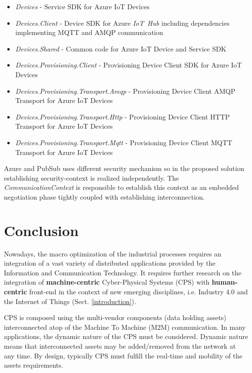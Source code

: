 \documentclass{jacsart}
\begin{document}
\begin{itemize}
      \item \textit{Devices} - Service SDK for Azure IoT Devices
      \item \textit{Devices.Client} - Device SDK for Azure \textit{IoT\ Hub} including dependencies implementing MQTT and AMQP communication
      \item \textit{Devices.Shared} - Common code for Azure IoT Device and Service SDK
      \item \textit{Devices.Provisioning.Client} - Provisioning Device Client SDK for Azure IoT Devices
      \item \textit{Devices.Provisioning.Transport.Amqp} - Provisioning Device Client AMQP Transport for Azure IoT Devices
      \item \textit{Devices.Provisioning.Transport.Http} - Provisioning Device Client HTTP Transport for Azure IoT Devices
      \item \textit{Devices.Provisioning.Transport.Mqtt} - Provisioning Device Client MQTT Transport for Azure IoT Devices
\end{itemize}

Azure and PubSub uses different security mechanism so in the proposed solution establishing security-context is realized independently. The \textit{CommunicationContext} is responsible to establish this context as an embedded negotiation phase tightly coupled with establishing interconnection.

\section{Conclusion}\label{section.conclusion}

Nowadays, the macro optimization of the industrial processes requires an integration of a vast variety of distributed applications provided by the Information and Communication Technology. It requires further research on the integration of \textbf{machine-centric} Cyber-Physical Systems (CPS) with \textbf{human-centric} front-end in the context of new emerging disciplines, i.e. Industry 4.0 and the Internet of Things (Sect. \ref*{introduction}).

CPS is composed using the multi-vendor components (data holding assets) interconnected atop of the Machine To Machine (M2M) communication. In many applications, the dynamic nature of the CPS must be considered. Dynamic nature means that interconnected assets may be added/removed from the network at any time. By design, typically CPS must fulfill the real-time and mobility of the assets requirements.
\end{document}
